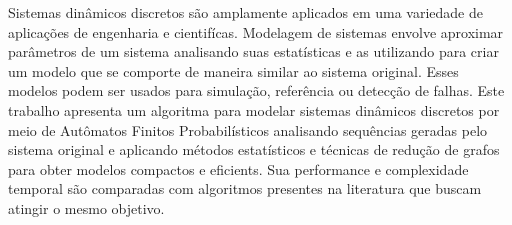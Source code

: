 Sistemas din\^{a}micos discretos s\~{a}o amplamente aplicados em uma variedade de aplica\c{c}\~{o}es de engenharia e cientif\'{i}cas. Modelagem de sistemas envolve aproximar par\^{a}metros de um sistema analisando suas estat\'{i}sticas e as utilizando para criar um modelo que se comporte de maneira similar ao sistema original. Esses modelos podem ser usados para simula\c{c}\~{a}o, refer\^{e}ncia ou detec\c{c}\~{a}o de falhas. Este trabalho apresenta um algoritma para modelar sistemas din\^{a}micos discretos por meio de Aut\^{o}matos Finitos Probabil\'{i}sticos analisando sequ\^{e}ncias geradas pelo sistema original e aplicando m\'{e}todos estat\'{i}sticos e t\'{e}cnicas de redu\c{c}\~{a}o de grafos para obter modelos compactos e eficients. Sua performance e complexidade temporal s\~{a}o comparadas com algoritmos presentes na literatura que buscam atingir o mesmo objetivo.